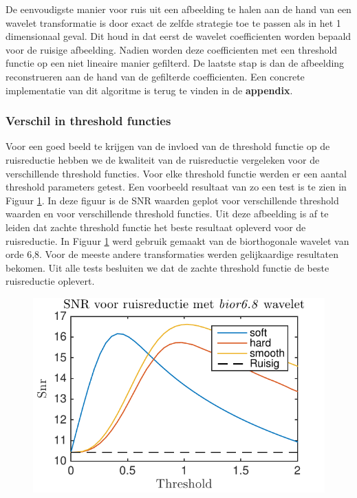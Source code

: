 De eenvoudigste manier voor ruis uit een afbeelding te halen aan de hand van een wavelet transformatie is door exact de zelfde strategie toe te passen als in het 1 dimensionaal geval.
Dit houd in dat eerst de wavelet coefficienten worden bepaald voor de ruisige afbeelding.
Nadien worden deze coefficienten met een threshold functie op een niet lineaire manier gefilterd.
De laatste stap is dan de afbeelding reconstrueren aan de hand van de gefilterde coefficienten.
Een concrete implementatie van dit algoritme is terug te vinden in de \textbf{appendix}.

\subsubsection{Verschil in threshold functies}

Voor een goed beeld te krijgen van de invloed van de threshold functie op de ruisreductie hebben we de kwaliteit van de ruisreductie vergeleken voor de verschillende threshold functies.
Voor elke threshold functie werden er een aantal threshold parameters getest.
Een voorbeeld resultaat van zo een test is te zien in Figuur \ref{fig:snr_image_bior6}.
In deze figuur is de SNR waarden geplot voor  verschillende threshold waarden en voor verschillende threshold functies.
Uit deze afbeelding is af te leiden dat zachte threshold functie het beste resultaat opleverd voor de ruisreductie.
In Figuur \ref{fig:snr_image_bior6} werd gebruik gemaakt van de biorthogonale wavelet van orde 6,8.
Voor de meeste andere transformaties werden gelijkaardige resultaten bekomen.
Uit alle tests besluiten  we dat de zachte threshold functie de beste ruisreductie oplevert.


\begin{figure}
\centering
\includegraphics[width=0.7\linewidth]{../src/denoising/image/snr_image_bior68_30.pdf}
\caption{}
\label{fig:snr_image_bior6}
\end{figure}


